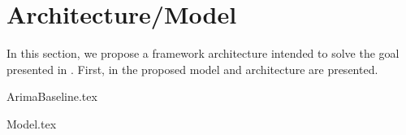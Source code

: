 \chapter{Architecture/Model}
\label{section:Architecture}

In this section, we propose a framework architecture intended to solve the goal presented in .
First, in  the proposed model and architecture are presented.

{ArimaBaseline.tex}

{Model.tex}

